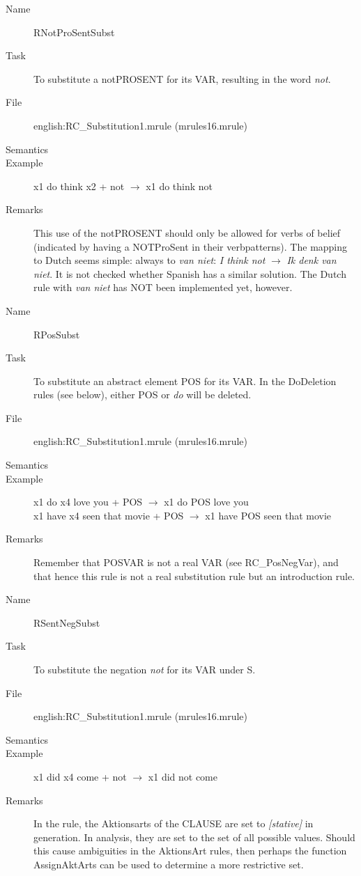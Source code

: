 \begin{description}
\vspace{1 cm}
\begin{description}
\item[Name] RNotProSentSubst
\item[Task] To substitute a notPROSENT for its VAR, resulting in the word {\em 
not\/}.
\item[File] english:RC\_Substitution1.mrule (mrules16.mrule)
\item[Semantics]
\item[Example] x1 do think x2 + not $\rightarrow$ x1 do think not
\item[Remarks] This use of the notPROSENT should only be allowed for verbs of 
belief (indicated by having a NOTProSent in their verbpatterns). The mapping to 
Dutch seems simple: always to {\em van niet\/}: {\em I think not\/} 
$\rightarrow$ {\em Ik denk van niet\/}. It is not checked whether Spanish has a 
similar solution. The Dutch rule with {\em van niet\/} has NOT been implemented 
yet, however.
\end{description}

\vspace{1 cm}
\begin{description}
\item[Name] RPosSubst
\item[Task] To substitute an abstract element POS for its VAR. In the 
DoDeletion rules (see below), either POS or {\em do\/} will be deleted.
\item[File] english:RC\_Substitution1.mrule (mrules16.mrule)
\item[Semantics]
\item[Example] x1 do x4 love you + POS $\rightarrow$ x1 do POS love you\\
x1 have x4 seen that movie + POS $\rightarrow$ x1 have POS seen that movie
\item[Remarks] Remember that POSVAR is not a real VAR (see RC\_PosNegVar), and 
that hence this rule is not a real substitution rule but an introduction rule.
\end{description}

\vspace{1 cm}
\begin{description}
\item[Name] RSentNegSubst
\item[Task] To substitute the negation {\em not\/} for its VAR under S.
\item[File] english:RC\_Substitution1.mrule (mrules16.mrule)
\item[Semantics]
\item[Example] x1 did x4 come + not $\rightarrow$ x1 did not come
\item[Remarks] In the rule, the Aktionsarts of the CLAUSE are set to {\em 
[stative]\/} in generation. In analysis, they are set to the set of all 
possible values. Should this cause ambiguities in the AktionsArt rules, then 
perhaps the function AssignAktArts can be used to determine a more restrictive 
set.


\end{description}
\end{description}

